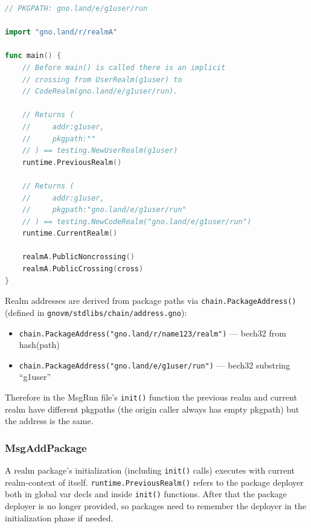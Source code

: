 \documentclass[12pt,a4paper]{article}
\providecommand{\tightlist}{\setlength{\itemsep}{0pt}\setlength{\parskip}{0pt}}
\newcommand{\passthrough}[1]{#1}
\begin{document}
\begin{lstlisting}[language=Go]
// PKGPATH: gno.land/e/g1user/run

import "gno.land/r/realmA"

func main() {
    // Before main() is called there is an implicit
    // crossing from UserRealm(g1user) to
    // CodeRealm(gno.land/e/g1user/run).

    // Returns (
    //     addr:g1user,
    //     pkgpath:""
    // ) == testing.NewUserRealm(g1user)
    runtime.PreviousRealm()

    // Returns (
    //     addr:g1user,
    //     pkgpath:"gno.land/e/g1user/run"
    // ) == testing.NewCodeRealm("gno.land/e/g1user/run")
    runtime.CurrentRealm()

    realmA.PublicNoncrossing()
    realmA.PublicCrossing(cross)
}
\end{lstlisting}

Realm addresses are derived from package paths via
\passthrough{\lstinline!chain.PackageAddress()!} (defined in
\passthrough{\lstinline!gnovm/stdlibs/chain/address.gno!}):

\begin{itemize}
\tightlist
\item
  \passthrough{\lstinline!chain.PackageAddress("gno.land/r/name123/realm")!}
  --- bech32 from hash(path)
\item
  \passthrough{\lstinline!chain.PackageAddress("gno.land/e/g1user/run")!}
  --- bech32 substring ``g1user''
\end{itemize}

Therefore in the MsgRun file's \passthrough{\lstinline!init()!} function
the previous realm and current realm have different pkgpaths (the origin
caller always has empty pkgpath) but the address is the same.

\subsubsection{MsgAddPackage}\label{msgaddpackage}

A realm package's initialization (including
\passthrough{\lstinline!init()!} calls) executes with current
realm-context of itself.
\passthrough{\lstinline!runtime.PreviousRealm()!} refers to the package
deployer both in global var decls and inside
\passthrough{\lstinline!init()!} functions. After that the package
deployer is no longer provided, so packages need to remember the
deployer in the initialization phase if needed.
\end{document}
